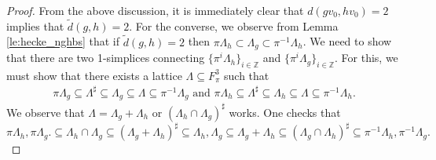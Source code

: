 \documentclass{eptcs}
\theoremstyle{remark}
\theoremstyle{definition}
\newcommand{\dual}[1]{{#1}^{\sharp}}
\begin{document}
\begin{proof}
From the above discussion, it is immediately clear that $d(gv_{0},hv_{0}) =2$ implies that $\tilde{d}(g,h) = 2$. For the converse, we observe from Lemma \ref{le:hecke_nghbs} that if $\tilde{d}(g,h)=2$ then $ \pi \Lambda_{h} \subset \Lambda_{g} \subset \pi^{-1} \Lambda_{h}$. We need to show that there are two 1-simplices connecting $\{\pi^{i}\Lambda_{h}\}_{i \in \mathbb{Z}}$ and $\{\pi^{i} \Lambda_{g}\}_{i \in \mathbb{Z}}$. For this, we must show that there exists a lattice $\Lambda \subseteq F_{\pi}^{3}$ such that 
\begin{align}
 \pi \Lambda_{g}\subseteq \dual{\Lambda} \subseteq  \Lambda_{g} \subseteq \Lambda  \subseteq \pi^{-1} \Lambda_{g} \text{ and }
 \pi \Lambda_{h}\subseteq \dual{\Lambda} \subseteq  \Lambda_{h} \subseteq \Lambda  \subseteq \pi^{-1} \Lambda_{h}.
\end{align}
We observe that $\Lambda = \Lambda_{g}+ \Lambda_{h}$ or $\dual{(\Lambda_h \cap \Lambda_g)}$ works. One checks that 
\begin{equation}
\pi \Lambda_h,\pi \Lambda_g. \subseteq 
    \Lambda_{h} \cap \Lambda_{g}\subseteq \dual{(\Lambda_{g} + \Lambda_h)}  \subseteq \Lambda_{h},\Lambda_{g}\subseteq  {\Lambda_{g}+ \Lambda_{h}}  \subseteq 
    \dual{(\Lambda_{g} \cap \Lambda_h)} \subseteq \pi^{-1} \Lambda_h, \pi^{-1} \Lambda_g.
\end{equation} 
\end{proof}
\end{document}
